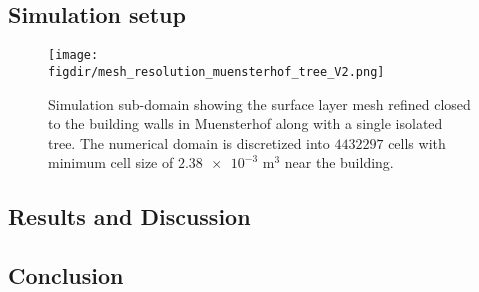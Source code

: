\subsection{Simulation setup}


\begin{sidewaysfigure}[p]
	\centering
	\texttt{[image: \\figdir/mesh\_resolution\_muensterhof\_tree\_V2.png]}
	\caption{Simulation sub-domain showing the surface layer mesh refined closed to the building walls in Muensterhof along with a single isolated tree. The numerical domain is discretized into $\num{4432297}$ cells with minimum cell size of $\num{2.38e-3}$ m$^{3}$ near the building.}
	\label{fig:mesh_resolution_muensterhof_tree}
\end{sidewaysfigure}


\subsection{Results and Discussion}

\subsection{Conclusion}

